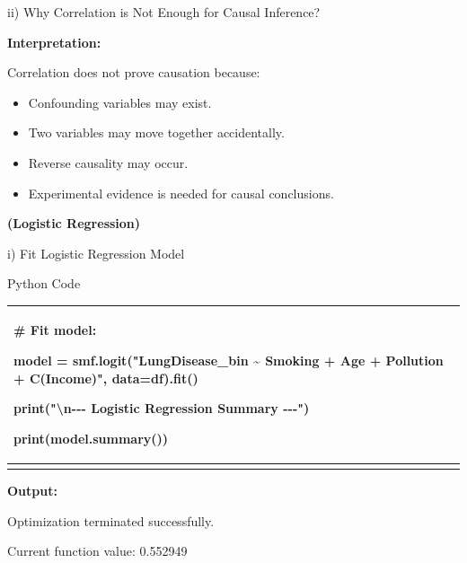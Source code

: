 \documentclass[
]{article}
\newcounter{none} %
\begin{document}
ii) Why Correlation is Not Enough for Causal Inference?

\textbf{Interpretation:}

Correlation does not prove causation because:

\begin{itemize}
\item
  Confounding variables may exist.
\item
  Two variables may move together accidentally.
\item
  Reverse causality may occur.
\item
  Experimental evidence is needed for causal conclusions.
\end{itemize}

\textbf{(Logistic Regression)}

i) Fit Logistic Regression Model

Python Code

{\def\LTcaptype{none} %
\begin{longtable}[]{@{}
  >{\raggedright\arraybackslash}p{}@{}}
\toprule\noalign{}
\begin{minipage}[b]{\linewidth}\raggedright
\# Fit model:

model = smf.logit("LungDisease\_bin \textasciitilde{} Smoking + Age +
Pollution + C(Income)", data=df).fit()

print("\textbackslash n-\/-\/- Logistic Regression Summary -\/-\/-")

print(model.summary())
\end{minipage} \\
\midrule\noalign{}
\endhead
\bottomrule\noalign{}
\endlastfoot
\end{longtable}
}

\textbf{Output:}

Optimization terminated successfully.

Current function value: 0.552949
\end{document}
